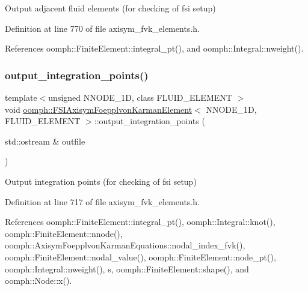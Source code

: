 Output adjacent fluid elements (for checking of fsi setup) 



Definition at line 770 of file axisym\+\_\+fvk\+\_\+elements.\+h.



References oomph\+::\+Finite\+Element\+::integral\+\_\+pt(), and oomph\+::\+Integral\+::nweight().

\mbox{\label{classoomph_1_1FSIAxisymFoepplvonKarmanElement_a8c7be29df60b6ed699d585c9e175333b}} 
\subsubsection{\texorpdfstring{output\+\_\+integration\+\_\+points()}{output\_integration\_points()}}
{\footnotesize\ttfamily template$<$unsigned N\+N\+O\+D\+E\+\_\+1D, class F\+L\+U\+I\+D\+\_\+\+E\+L\+E\+M\+E\+NT $>$ \\
void \hyperlink{classoomph_1_1FSIAxisymFoepplvonKarmanElement}{oomph\+::\+F\+S\+I\+Axisym\+Foepplvon\+Karman\+Element}$<$ N\+N\+O\+D\+E\+\_\+1D, F\+L\+U\+I\+D\+\_\+\+E\+L\+E\+M\+E\+NT $>$\+::output\+\_\+integration\+\_\+points (\begin{DoxyParamCaption}\item[{std\+::ostream \&}]{outfile }\end{DoxyParamCaption})\hspace{0.3cm}{\ttfamily [inline]}}



Output integration points (for checking of fsi setup) 



Definition at line 717 of file axisym\+\_\+fvk\+\_\+elements.\+h.



References oomph\+::\+Finite\+Element\+::integral\+\_\+pt(), oomph\+::\+Integral\+::knot(), oomph\+::\+Finite\+Element\+::nnode(), oomph\+::\+Axisym\+Foepplvon\+Karman\+Equations\+::nodal\+\_\+index\+\_\+fvk(), oomph\+::\+Finite\+Element\+::nodal\+\_\+value(), oomph\+::\+Finite\+Element\+::node\+\_\+pt(), oomph\+::\+Integral\+::nweight(), s, oomph\+::\+Finite\+Element\+::shape(), and oomph\+::\+Node\+::x().


